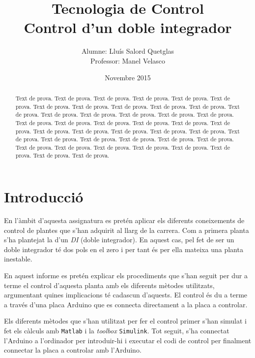 \documentclass[12pt,a4paper,final,twoside,openright]{report}
\title{Tecnologia de Control \\ Control d'un doble integrador}
\author{Alumne: Lluís Salord Quetglas \\ Professor: Manel Velasco}
\date{Novembre 2015}
\begin{document}
\maketitle
\thispagestyle{empty}

\cleardoublepage

\setcounter{page}{1} %

\begin{abstract}

Text de prova. Text de prova. Text de prova. Text de prova. Text de prova. Text de prova. Text de prova. Text de prova. Text de prova. Text de prova. Text de prova. Text de prova. Text de prova. Text de prova. Text de prova. Text de prova. Text de prova. Text de prova. Text de prova. Text de prova. Text de prova. Text de prova. Text de prova. Text de prova. Text de prova. Text de prova. Text de prova. Text de prova. Text de prova. Text de prova. Text de prova. Text de prova. Text de prova. Text de prova. Text de prova. Text de prova. Text de prova. Text de prova. Text de prova. Text de prova. Text de prova. Text de prova.

\end{abstract}

\tableofcontents

\listoffigures

\listoftables

\chapter{Introducció}

En l'àmbit d'aquesta assignatura es pretén aplicar els diferents coneixements de control de plantes que s'han adquirit al llarg de la carrera. Com a primera planta s'ha plantejat la d'un \textit{DI} (doble integrador). En aquest cas, pel fet de ser un doble integrador té dos pols en el zero i per tant és per ella mateixa una planta inestable.

En aquest informe es pretén explicar els procediments que s'han seguit per dur a terme el control d'aquesta planta amb els diferents mètodes utilitzats, argumentant quines implicacions té cadascun d'aquests. El control és du a terme a través d'una placa Arduino que es connecta directament a la placa a controlar.

Els diferents mètodes que s'han utilitzat per fer el control primer s'han simulat i fet els càlculs amb \texttt{Matlab} i la \textit{toolbox} \texttt{Simulink}. Tot seguit, s'ha connectat l'Arduino a l'ordinador per introduir-hi i executar el codi de control per finalment connectar la placa a controlar amb l'Arduino.
\end{document}
